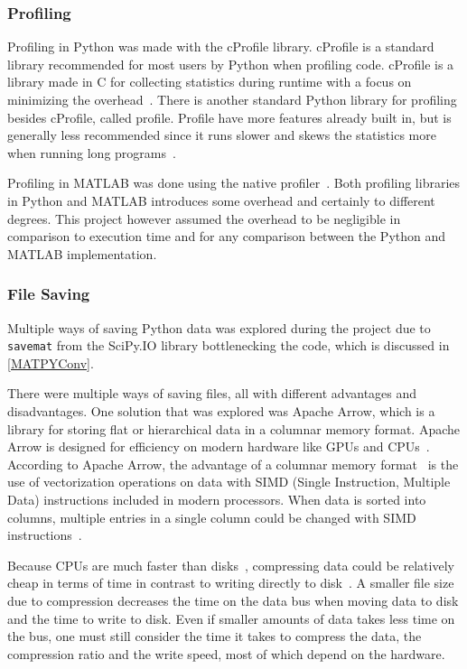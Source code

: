 \documentclass[12pt, a4paper]{article}
\begin{document}
\subsubsection{Profiling}

Profiling in Python was made with the cProfile library.
cProfile is a standard library recommended for most users by Python when profiling code.
cProfile is a library made in C for collecting statistics during runtime with a focus on minimizing the overhead~\cite{Py:cProfile}.
There is another standard Python library for profiling besides cProfile, called profile.
Profile have more features already built in, but is generally less recommended since it runs slower and skews the statistics more when running long programs~\cite{Py:cProfile}.

Profiling in MATLAB was done using the native profiler~\cite{matProfile}.
Both profiling libraries in Python and MATLAB introduces some overhead and certainly to different degrees.
This project however assumed the overhead to be negligible in comparison to execution time and for any comparison between the Python and MATLAB implementation.%

\subsubsection{File Saving}

Multiple ways of saving Python data was explored during the project due to \texttt{savemat} from the SciPy.IO library bottlenecking the code, which is discussed in \cref{MATPYConv}.


There were multiple ways of saving files, all with different advantages and disadvantages.
One solution that was explored was Apache Arrow, which is a library for storing flat or hierarchical data in a columnar memory format.
Apache Arrow is designed for efficiency on modern hardware like GPUs and CPUs~\cite{AA:apacheArrow}.
According to Apache Arrow, the advantage of a columnar memory format~\cite{enwiki:columnarData} is the use of vectorization operations on data with SIMD (Single Instruction, Multiple Data) instructions included in modern processors.
When data is sorted into columns, multiple entries in a single column could be changed with SIMD instructions~\cite{AA:Overview}.


Because CPUs are much faster than disks~\cite{DiskSlow}, compressing data could be relatively cheap in terms of time in contrast to writing directly to disk~\cite{1607248}.
A smaller file size due to compression decreases the time on the data bus when moving data to disk and the time to write to disk.
Even if smaller amounts of data takes less time on the bus, one must still consider the time it takes to compress the data, the compression ratio and the write speed, most of which depend on the hardware.
\end{document}
